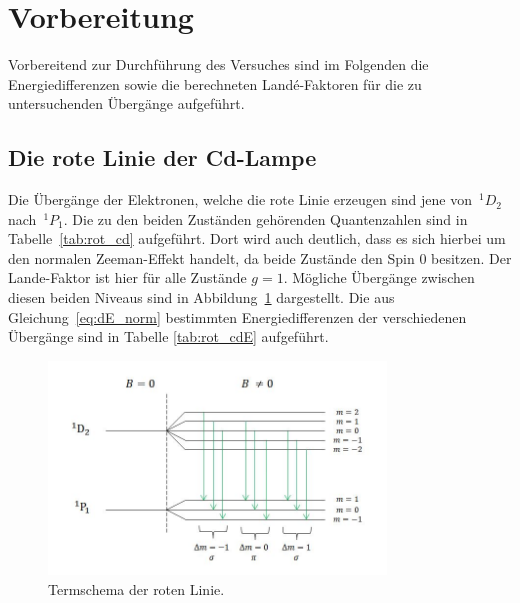 \section{Vorbereitung}
\label{sec:vorbereitung}
Vorbereitend zur Durchführung des Versuches sind im Folgenden die Energiedifferenzen
sowie die berechneten Landé-Faktoren für die zu untersuchenden Übergänge aufgeführt.

\subsection{Die rote Linie der Cd-Lampe}
Die Übergänge der Elektronen, welche die rote Linie erzeugen sind jene von~$^{1}D_2$
nach~$^{1}P_1$. Die zu den beiden Zuständen gehörenden Quantenzahlen sind in
Tabelle~\ref{tab:rot_cd} aufgeführt. Dort wird auch deutlich, dass es sich hierbei
um den normalen Zeeman-Effekt handelt, da beide Zustände den Spin $0$ besitzen. Der
Lande-Faktor ist hier für alle Zustände $g=1$. Mögliche Übergänge zwischen diesen
beiden Niveaus sind in Abbildung~\ref{fig:therm_rot} dargestellt. Die aus
Gleichung~\eqref{eq:dE_norm} bestimmten Energiedifferenzen der verschiedenen
Übergänge sind in Tabelle \ref{tab:rot_cdE} aufgeführt.

\begin{figure}
    \centering
    \includegraphics[width=0.8\textwidth]{graphics/termschema_rot.jpg}
    \caption{Termschema der roten Linie.}
    \label{fig:therm_rot}
\end{figure}

